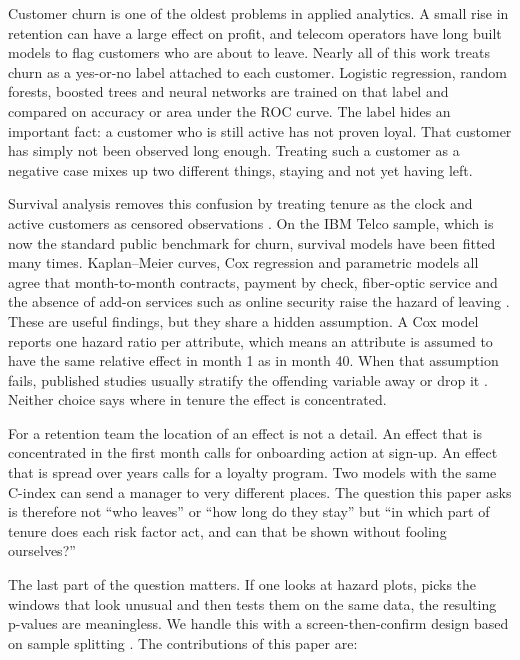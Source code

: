 \documentclass[conference]{IEEEtran}
\begin{document}
Customer churn is one of the oldest problems in applied analytics. A small rise in retention can have a large effect on profit, and telecom operators have long built models to flag customers who are about to leave. Nearly all of this work treats churn as a yes-or-no label attached to each customer. Logistic regression, random forests, boosted trees and neural networks are trained on that label and compared on accuracy or area under the ROC curve. The label hides an important fact: a customer who is still active has not proven loyal. That customer has simply not been observed long enough. Treating such a customer as a negative case mixes up two different things, staying and not yet having left.

Survival analysis removes this confusion by treating tenure as the clock and active customers as censored observations \cite{cox1972}. On the IBM Telco sample, which is now the standard public benchmark for churn, survival models have been fitted many times. Kaplan--Meier curves, Cox regression and parametric models all agree that month-to-month contracts, payment by check, fiber-optic service and the absence of add-on services such as online security raise the hazard of leaving \cite{rahman2024,ishtiaq2026,havrylovych2019}. These are useful findings, but they share a hidden assumption. A Cox model reports one hazard ratio per attribute, which means an attribute is assumed to have the same relative effect in month 1 as in month 40. When that assumption fails, published studies usually stratify the offending variable away or drop it \cite{ishtiaq2026,masarifoglu2019}. Neither choice says where in tenure the effect is concentrated.

For a retention team the location of an effect is not a detail. An effect that is concentrated in the first month calls for onboarding action at sign-up. An effect that is spread over years calls for a loyalty program. Two models with the same C-index can send a manager to very different places. The question this paper asks is therefore not ``who leaves'' or ``how long do they stay'' but ``in which part of tenure does each risk factor act, and can that be shown without fooling ourselves?''

The last part of the question matters. If one looks at hazard plots, picks the windows that look unusual and then tests them on the same data, the resulting p-values are meaningless. We handle this with a screen-then-confirm design based on sample splitting \cite{cox1975}. The contributions of this paper are:
\end{document}
